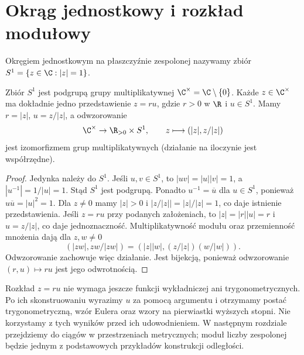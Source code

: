 \section{Okrąg jednostkowy i rozkład modułowy}
\begin{definicja}
\label{ma1:def:unit-circle}
Okręgiem jednostkowym na płaszczyźnie zespolonej nazywamy zbiór
$S^1=\{z\in\C:|z|=1\}$.
\end{definicja}
\begin{twierdzenie}
\label{ma1:thm:unit-circle-decomposition}
Zbiór $S^1$ jest podgrupą grupy multiplikatywnej $\C^\times=\C\setminus\{0\}$. Każde $z\in\C^\times$ ma dokładnie jedno przedstawienie $z=ru$, gdzie $r>0$ w $\R$ i $u\in S^1$. Mamy $r=|z|$, $u=z/|z|$, a odwzorowanie
\[
 \C^\times\to\R_{>0}\times S^1,\qquad z\longmapsto(|z|,z/|z|)
\]
jest izomorfizmem grup multiplikatywnych (działanie na iloczynie jest współrzędne).
\end{twierdzenie}
\begin{proof}
Jedynka należy do $S^1$. Jeśli $u,v\in S^1$, to $|uv|=|u||v|=1$, a $|u^{-1}|=1/|u|=1$. Stąd $S^1$ jest podgrupą. Ponadto $u^{-1}=\overline u$ dla $u\in S^1$, ponieważ $u\overline u=|u|^2=1$.
Dla $z\ne0$ mamy $|z|>0$ i $\left|z/|z|\right|=|z|/|z|=1$, co daje istnienie przedstawienia. Jeśli $z=ru$ przy podanych założeniach, to $|z|=|r||u|=r$ i $u=z/|z|$, co daje jednoznaczność.
Multiplikatywność modułu oraz przemienność mnożenia dają dla $z,w\ne0$
\[
 (|zw|,zw/|zw|)
 =(|z||w|,(z/|z|)(w/|w|)).
\]
Odwzorowanie zachowuje więc działanie. Jest bijekcją, ponieważ odwzorowanie $(r,u)\mapsto ru$ jest jego odwrotnością.
\end{proof}
\begin{uwaga}
Rozkład $z=ru$ nie wymaga jeszcze funkcji wykładniczej ani trygonometrycznych. Po ich skonstruowaniu wyrazimy $u$ za pomocą argumentu i otrzymamy postać trygonometryczną, wzór Eulera oraz wzory na pierwiastki wyższych stopni. Nie korzystamy z tych wyników przed ich udowodnieniem. W następnym rozdziale przejdziemy do ciągów w przestrzeniach metrycznych; moduł liczby zespolonej będzie jednym z podstawowych przykładów konstrukcji odległości.
\end{uwaga}
